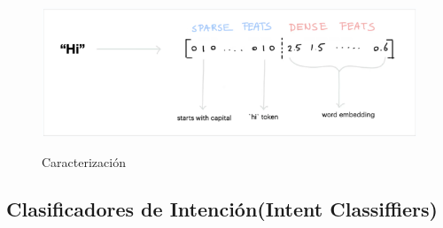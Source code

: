 \begin{figure}[h!]
	\centering
	\includegraphics[width=\textwidth]{imagenes/cap3/featurizers.png}
	\caption{Caracterización}
	\label{fig:feazturization-MLU}
	\cite{Rasa}
\end{figure}

\subsection{Clasificadores de Intención(Intent Classiffiers)}

